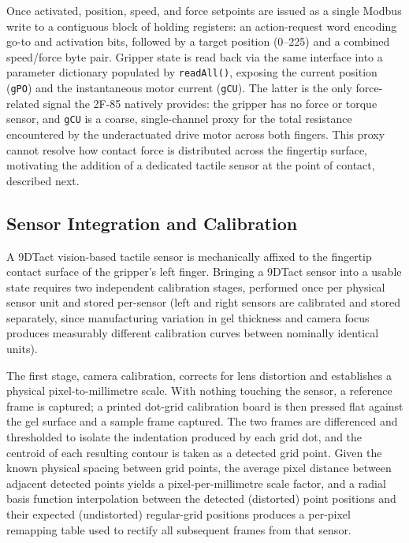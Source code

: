 \documentclass[12pt, a4paper]{report}
\begin{document}
Once activated, position, speed, and force setpoints are issued as a single Modbus write to a contiguous block of holding registers: an action-request word encoding go-to and activation bits, followed by a target position (0--225) and a combined speed/force byte pair. Gripper state is read back via the same interface into a parameter dictionary populated by \texttt{readAll()}, exposing the current position (\texttt{gPO}) and the instantaneous motor current (\texttt{gCU}). The latter is the only force-related signal the 2F-85 natively provides: the gripper has no force or torque sensor, and \texttt{gCU} is a coarse, single-channel proxy for the total resistance encountered by the underactuated drive motor across both fingers. This proxy cannot resolve how contact force is distributed across the fingertip surface, motivating the addition of a dedicated tactile sensor at the point of contact, described next.

\subsection{Sensor Integration and Calibration}
\label{subsec:sensorcalib}
A 9DTact vision-based tactile sensor is mechanically affixed to the fingertip contact surface of the gripper's left finger. Bringing a 9DTact sensor into a usable state requires two independent calibration stages, performed once per physical sensor unit and stored per-sensor (left and right sensors are calibrated and stored separately, since manufacturing variation in gel thickness and camera focus produces measurably different calibration curves between nominally identical units).

The first stage, camera calibration, corrects for lens distortion and establishes a physical pixel-to-millimetre scale. With nothing touching the sensor, a reference frame is captured; a printed dot-grid calibration board is then pressed flat against the gel surface and a sample frame captured. The two frames are differenced and thresholded to isolate the indentation produced by each grid dot, and the centroid of each resulting contour is taken as a detected grid point. Given the known physical spacing between grid points, the average pixel distance between adjacent detected points yields a pixel-per-millimetre scale factor, and a radial basis function interpolation between the detected (distorted) point positions and their expected (undistorted) regular-grid positions produces a per-pixel remapping table used to rectify all subsequent frames from that sensor.
\end{document}
